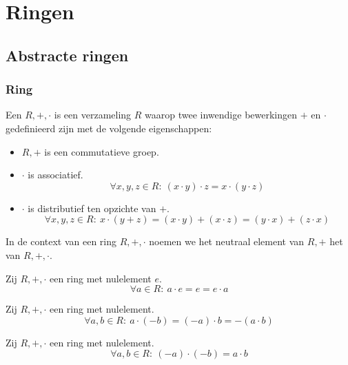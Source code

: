 \documentclass[main.tex]{subfiles}
\begin{document}
\chapter{Ringen}
\label{cha:ringen}

\section{Abstracte ringen}
\label{sec:abstracte-ringen}

\subsection{Ring}
\label{sec:ring}

\begin{de}
  Een  $R,+,\cdot$ is een verzameling $R$ waarop twee inwendige bewerkingen $+$ en $\cdot$ gedefinieerd zijn met de volgende eigenschappen:
  \begin{itemize}
  \item $R,+$ is een commutatieve groep.
  \item $\cdot$ is associatief.
    \[ \forall x,y,z \in R:\ (x\cdot y) \cdot z = x \cdot (y \cdot z) \]
  \item $\cdot$ is distributief ten opzichte van $+$.
    \[ \forall x,y,z \in R:\ x\cdot (y + z) = (x \cdot y) + (x \cdot z) = (y \cdot x) + (z \cdot x) \]
  \end{itemize}
\end{de}

\begin{de}
  In de context van een ring $R,+,\cdot$ noemen we het neutraal element van $R,+$ het  van $R,+,\cdot$.
\end{de}

\begin{ei}
  Zij $R,+,\cdot$ een ring met nulelement $e$.
  \[ \forall a \in R:\ a \cdot e = e = e \cdot a \]
\end{ei}

\begin{ei}
  Zij $R,+,\cdot$ een ring met nulelement.
  \[ \forall a,b \in R:\ a \cdot (-b) = (-a) \cdot b = -(a \cdot b) \]
\end{ei}

\begin{ei}
  Zij $R,+,\cdot$ een ring met nulelement.
  \[ \forall a,b \in R:\ (-a) \cdot (-b) = a \cdot b \]
\end{ei}
\end{document}
